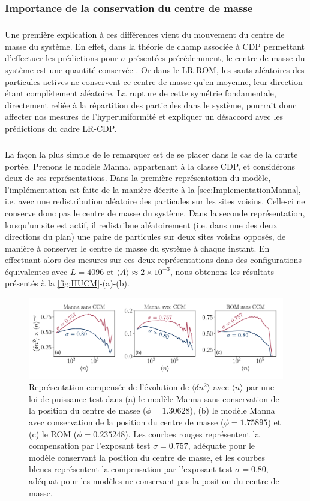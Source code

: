 \subsubsection{Importance de la conservation du centre de masse}

\subparagraph{}Une première explication à ces différences vient du mouvement du centre de masse du système. En effet, dans la théorie de champ associée à CDP permettant d'effectuer les prédictions pour $\sigma$ présentées précédemment, le centre de masse du système est une quantité conservée \cite{wiese_blabla}. Or dans le LR-ROM, les sauts aléatoires des particules actives ne conservent ce centre de masse qu'en moyenne, leur direction étant complètement aléatoire. La rupture de cette symétrie fondamentale, directement reliée à la répartition des particules dans le système, pourrait donc affecter nos mesures de l'hyperuniformité et expliquer un désaccord avec les prédictions du cadre LR-CDP.

\subparagraph{}La façon la plus simple de le remarquer est de se placer dans le cas de la courte portée. Prenons le modèle Manna, appartenant à la classe CDP, et considérons deux de ses représentations. Dans la première représentation du modèle, l'implémentation est faite de la manière décrite à la \autoref{sec:ImplementationManna}, i.e. avec une redistribution aléatoire des particules sur les sites voisins. Celle-ci ne conserve donc pas le centre de masse du système. Dans la seconde représentation, lorsqu'un site est actif, il redistribue aléatoirement (i.e. dans une des deux directions du plan) une paire de particules sur deux sites voisins opposés, de manière à conserver le centre de masse du système à chaque instant. En effectuant alors des mesures sur ces deux représentations dans des configurations équivalentes avec $L=4096$ et $\langle A \rangle \approx 2\times 10^{-3}$, nous obtenons les résultats présentés à la \autoref{fig:HUCM}-(a)-(b).

\begin{figure}[h]
	\centering
	\includegraphics[width=\textwidth]{Chapitre2/Figures/Hyperuniformity/ImportanceCMHU.pdf}
	\caption{Représentation compensée de l'évolution de $\langle \delta n^2 \rangle$ avec $\langle n \rangle$ par une loi de puissance test dans (a) le modèle Manna sans conservation de la position du centre de masse ($\phi = 1.30628$), (b) le modèle Manna avec conservation de la position du centre de masse ($\phi = 1.75895$) et (c) le ROM ($\phi = 0.235248$). Les courbes rouges représentent la compensation par l'exposant test $\sigma = 0.757$, adéquate pour le modèle conservant la position du centre de masse, et les courbes bleues représentent la compensation par l'exposant test $\sigma = 0.80$, adéquat pour les modèles ne conservant pas la position du centre de masse.}
	\label{fig:HUCM}
\end{figure}

